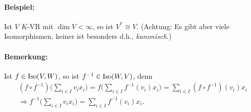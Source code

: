 \paragraph{Beispiel: }
	Ist $V$ $K$-VR mit $\dim V < \infty$, so ist $V^\ast \cong V$. (Achtung: Es gibt aber viele Isomorphismen, keiner ist besonders d.h., \emph{kanonisch}.)
	
\paragraph{Bemerkung: }
	Ist $f\in \operatorname{Iso}(V,W)$, so ist $f^{-1}\in \operatorname{Iso}(W,V)$, denn
	\begin{gather*}
		(f\circ f^{-1})\Big(\sum_{i\in I}v_ix_i\Big) = f\Big(\sum_{i\in I}f^{-1}(v_i)x_i\Big) = \sum_{i\in I}(f\circ f^{-1})(v_i)x_i\\
		\Rightarrow f^{-1}\Big(\sum_{i\in I}v_ix_i\Big) = \sum_{i\in I}f^{-1}(v_i)x_i.
	\end{gather*}
